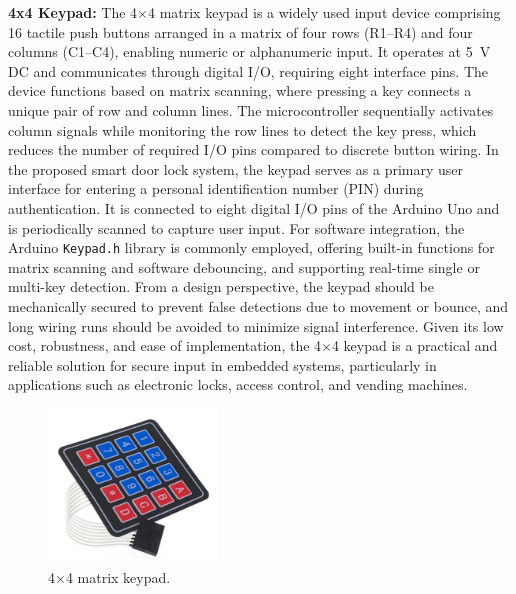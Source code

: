 \documentclass[conference, onecolumn]{IEEEtran}
\begin{document}
 \textbf{4x4 Keypad:} The 4×4 matrix keypad is a widely used input device comprising 16 tactile push buttons arranged in a matrix of four rows (R1–R4) and four columns (C1–C4), enabling numeric or alphanumeric input. It operates at 5~V DC and communicates through digital I/O, requiring eight interface pins. The device functions based on matrix scanning, where pressing a key connects a unique pair of row and column lines. The microcontroller sequentially activates column signals while monitoring the row lines to detect the key press, which reduces the number of required I/O pins compared to discrete button wiring. In the proposed smart door lock system, the keypad serves as a primary user interface for entering a personal identification number (PIN) during authentication. It is connected to eight digital I/O pins of the Arduino Uno and is periodically scanned to capture user input. For software integration, the Arduino \texttt{Keypad.h} library is commonly employed, offering built-in functions for matrix scanning and software debouncing, and supporting real-time single or multi-key detection. From a design perspective, the keypad should be mechanically secured to prevent false detections due to movement or bounce, and long wiring runs should be avoided to minimize signal interference. Given its low cost, robustness, and ease of implementation, the 4×4 keypad is a practical and reliable solution for secure input in embedded systems, particularly in applications such as electronic locks, access control, and vending machines.

\begin{figure}[H]
	\centering
	\includegraphics[width=0.4\textwidth]{KEYpad.pdf}
	\caption{4×4 matrix keypad.}
	\label{fig5}
\end{figure}
\end{document}
